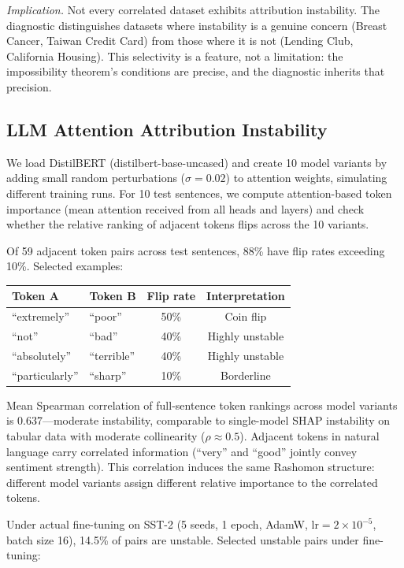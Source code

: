 \documentclass{article}
\begin{document}
\emph{Implication.}
Not every correlated dataset exhibits attribution instability.
The diagnostic distinguishes datasets where instability is a genuine
concern (Breast Cancer, Taiwan Credit Card) from those where it is
not (Lending Club, California Housing). This selectivity is a
feature, not a limitation: the impossibility theorem's conditions are
precise, and the diagnostic inherits that precision.

\subsection{LLM Attention Attribution Instability}

We load DistilBERT (distilbert-base-uncased) and create 10 model variants by adding small random perturbations ($\sigma = 0.02$) to attention weights, simulating different training runs. For 10 test sentences, we compute attention-based token importance (mean attention received from all heads and layers) and check whether the relative ranking of adjacent tokens flips across the 10 variants.

Of 59 adjacent token pairs across test sentences, 88\% have flip rates exceeding 10\%. Selected examples:

\begin{center}
\small
\begin{tabular}{@{}llcc@{}}
\toprule
Token A & Token B & Flip rate & Interpretation \\
\midrule
``extremely'' & ``poor'' & 50\% & Coin flip \\
``not'' & ``bad'' & 40\% & Highly unstable \\
``absolutely'' & ``terrible'' & 40\% & Highly unstable \\
``particularly'' & ``sharp'' & 10\% & Borderline \\
\bottomrule
\end{tabular}
\end{center}

Mean Spearman correlation of full-sentence token rankings across model variants is 0.637---moderate instability, comparable to single-model SHAP instability on tabular data with moderate collinearity ($\rho \approx 0.5$). Adjacent tokens in natural language carry correlated information (``very'' and ``good'' jointly convey sentiment strength). This correlation induces the same Rashomon structure: different model variants assign different relative importance to the correlated tokens.

Under actual fine-tuning on SST-2 (5 seeds, 1 epoch, AdamW, lr$=2{\times}10^{-5}$, batch size 16), 14.5\% of pairs are unstable. Selected unstable pairs under fine-tuning:
\end{document}
